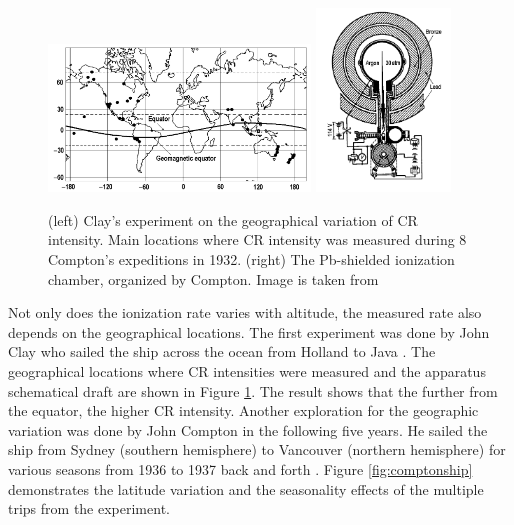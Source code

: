 
\begin{figure}[h!]
    \centering
        \subfloat
        {
            \includegraphics[width=0.62\textwidth]{content/background/figures/clay_geographical.png}
        }
        \hfill
        \subfloat
        {
            \includegraphics[width=0.32\textwidth]{content/background/figures/compton_pb_shield.png}
        }
        \caption{
            (left) Clay's experiment on the geographical variation
            of CR intensity. Main locations where CR intensity was
            measured during 8 Compton's expeditions in 1932.
            (right) The Pb-shielded ionization chamber, 
            organized by Compton. Image is taken from
            \cite{text_cr_geomagnetic_effect} 
        }
       \label{fig:clay_cr_ship}
\end{figure}

Not only does the ionization rate varies with altitude,
the measured rate also depends on the geographical locations.
The first experiment was done by John Clay who
sailed the ship across the ocean from Holland to Java
\citep{Clay1927,Clay1928}. The geographical locations
where CR intensities were measured
and the apparatus schematical draft are shown in Figure
\ref{fig:clay_cr_ship}. The result shows that
the further from the equator, the higher CR intensity.
Another exploration for the geographic variation was 
done by John Compton in the following five years.
He sailed the ship from Sydney (southern hemisphere)
to Vancouver (northern hemisphere) for various seasons
from 1936 to 1937 back and forth \citep{compton1937cosmic}.
Figure \ref{fig:comptonship} demonstrates the 
latitude variation and the seasonality effects of the 
multiple trips from the experiment.

